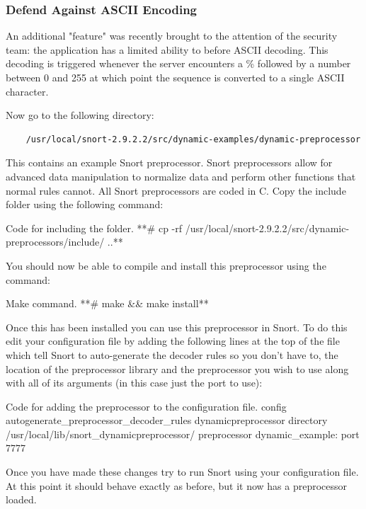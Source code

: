 \documentclass[a4paper,11pt,hidelinks]{article}
\begin{document}
\clearpage

\subsubsection{Defend Against ASCII Encoding}

An additional "feature" was recently brought to the attention of the security team: the application has a limited ability to before ASCII decoding. This decoding is triggered whenever the server encounters a \% followed by a number between 0 and 255 at which point the sequence is converted to a single ASCII character.

Now go to the following directory: 
\begin{verbatim}
    /usr/local/snort-2.9.2.2/src/dynamic-examples/dynamic-preprocessor
\end{verbatim}

This contains an example Snort preprocessor. Snort preprocessors allow for advanced data manipulation to normalize data and perform other functions that normal rules cannot. All Snort preprocessors are coded in C. Copy the include folder using the following command:

\begin{code}{Code for including the folder.}
**# cp -rf /usr/local/snort-2.9.2.2/src/dynamic-preprocessors/include/ ..**
\end{code}

You should now be able to compile and install this preprocessor using the command:

\begin{code}{Make command.}
**# make && make install**
\end{code}

Once this has been installed you can use this preprocessor in Snort. To do this edit your configuration file by adding the following lines at the top of the file which tell Snort to auto-generate the decoder rules so you don't have to, the location of the preprocessor library and the preprocessor you wish to use along with all of its arguments (in this case just the port to use):

\begin{code}{Code for adding the preprocessor to the configuration file.}
config autogenerate_preprocessor_decoder_rules
dynamicpreprocessor directory /usr/local/lib/snort_dynamicpreprocessor/
preprocessor dynamic_example: port 7777
\end{code}

Once you have made these changes try to run Snort using your configuration file. At this point it should behave exactly as before, but it now has a preprocessor loaded.
\end{document}
